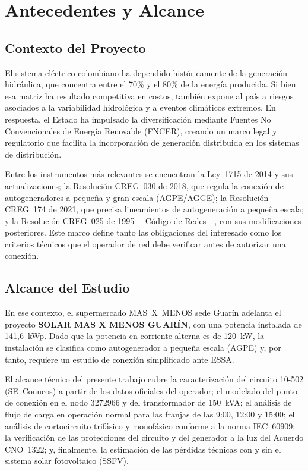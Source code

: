 \chapter{Antecedentes y Alcance}

\section{Contexto del Proyecto}

El sistema eléctrico colombiano ha dependido históricamente de la generación hidráulica, que concentra entre el 70\% y el 80\% de la energía producida. Si bien esa matriz ha resultado competitiva en costos, también expone al país a riesgos asociados a la variabilidad hidrológica y a eventos climáticos extremos. En respuesta, el Estado ha impulsado la diversificación mediante Fuentes No Convencionales de Energía Renovable (FNCER), creando un marco legal y regulatorio que facilita la incorporación de generación distribuida en los sistemas de distribución.

Entre los instrumentos más relevantes se encuentran la Ley~1715 de 2014 y sus actualizaciones; la Resolución CREG~030 de 2018, que regula la conexión de autogeneradores a pequeña y gran escala (AGPE/AGGE); la Resolución CREG~174 de 2021, que precisa lineamientos de autogeneración a pequeña escala; y la Resolución CREG~025 de 1995 ---Código de Redes---, con sus modificaciones posteriores. Este marco define tanto las obligaciones del interesado como los criterios técnicos que el operador de red debe verificar antes de autorizar una conexión.

\section{Alcance del Estudio}

En ese contexto, el supermercado MAS~X~MENOS sede Guarín adelanta el proyecto \textbf{SOLAR MAS X MENOS GUARÍN}, con una potencia instalada de 141,6~kWp. Dado que la potencia en corriente alterna es de 120~kW, la instalación se clasifica como autogenerador a pequeña escala (AGPE) y, por tanto, requiere un estudio de conexión simplificado ante ESSA.

El alcance técnico del presente trabajo cubre la caracterización del circuito 10-502 (SE~Conucos) a partir de los datos oficiales del operador; el modelado del punto de conexión en el nodo 3272966 y del transformador de 150~kVA; el análisis de flujo de carga en operación normal para las franjas de las 9:00, 12:00 y 15:00; el análisis de cortocircuito trifásico y monofásico conforme a la norma IEC~60909; la verificación de las protecciones del circuito y del generador a la luz del Acuerdo CNO~1322; y, finalmente, la estimación de las pérdidas técnicas con y sin el sistema solar fotovoltaico (SSFV).

